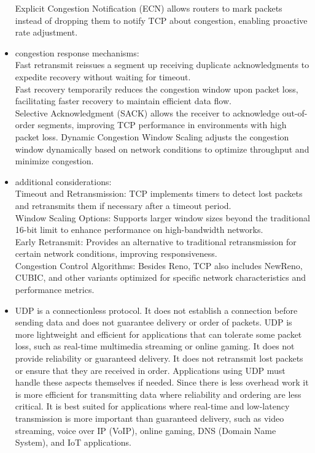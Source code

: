 \documentclass{article}
\begin{document}
\begin{itemize}
		Explicit Congestion Notification (ECN) allows routers to mark packets instead of dropping them to notify TCP about congestion, enabling proactive rate adjustment.
	\item[] congestion response mechanisms:\\
		Fast retransmit reissues a segment up receiving duplicate acknowledgments to expedite recovery without waiting for timeout.\\
		Fast recovery temporarily reduces the congestion window upon packet loss, facilitating faster recovery to maintain efficient data flow.\\
		Selective Acknowledgment (SACK) allows the receiver to acknowledge out-of-order segments, improving TCP performance in environments with high packet loss.
		Dynamic Congestion Window Scaling adjusts the congestion window dynamically based on network conditions to optimize throughput and minimize congestion.\\
	\item[] additional considerations:\\
		Timeout and Retransmission: TCP implements timers to detect lost packets and retransmits them if necessary after a timeout period.\\
		Window Scaling Options: Supports larger window sizes beyond the traditional 16-bit limit to enhance performance on high-bandwidth networks.\\
		Early Retransmit: Provides an alternative to traditional retransmission for certain network conditions, improving responsiveness.\\
		Congestion Control Algorithms: Besides Reno, TCP also includes NewReno, CUBIC, and other variants optimized for specific network characteristics and performance metrics.\\
  	\item[] UDP is a connectionless protocol. It does not establish a connection before sending data and does not guarantee delivery or order of packets. UDP is more lightweight and efficient for applications that can tolerate some packet loss, such as real-time multimedia streaming or online gaming. It does not provide reliability or guaranteed delivery. It does not retransmit lost packets or ensure that they are received in order. Applications using UDP must handle these aspects themselves if needed. Since there is less overhead work it is more efficient for transmitting data where reliability and ordering are less critical. It is best suited for applications where real-time and low-latency transmission is more important than guaranteed delivery, such as video streaming, voice over IP (VoIP), online gaming, DNS (Domain Name System), and IoT applications.
  	

\end{itemize}
\end{document}
